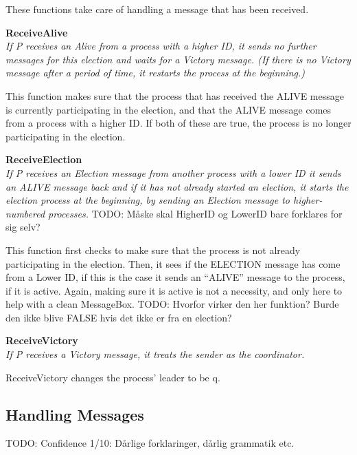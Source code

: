 \documentclass{report}
\begin{document}
These functions take care of handling a message that has been received.

\textbf{ReceiveAlive}\\
\textit{If P receives an Alive from a process with a higher ID, it sends no further messages for this election and waits for a Victory message. (If there is no Victory message after a period of time, it restarts the process at the beginning.)}

This function makes sure that the process that has received the ALIVE message is currently participating in the election, and that the ALIVE message comes from a process with a higher ID. If both of these are true, the process is no longer participating in the election.

\textbf{ReceiveElection}\\
\textit{If P receives an Election message from another process with a lower ID it sends an ALIVE message back and if it has not already started an election, it starts the election process at the beginning, by sending an Election message to higher-numbered processes.}
TODO: Måske skal HigherID og LowerID bare forklares for sig selv?

This function first checks to make sure that the process is not already participating in the election. Then, it sees if the ELECTION message has come from a Lower ID, if this is the case it sends an ``ALIVE'' message to the process, if it is active. Again, making sure it is active is not a necessity, and only here to help with a clean MessageBox.
TODO: Hvorfor virker den her funktion? Burde den ikke blive FALSE hvis det ikke er fra en election?

\textbf{ReceiveVictory}\\
\textit{If P receives a Victory message, it treats the sender as the coordinator.}

ReceiveVictory changes the process' leader to be q.


\subsection{Handling Messages}
TODO: Confidence 1/10: Dårlige forklaringer, dårlig grammatik etc.

\noindent{}
\end{document}
